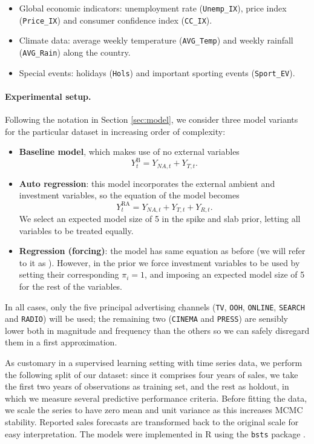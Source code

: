 \begin{itemize}
\item Global economic indicators: unemployment rate (\texttt{Unemp\_IX}), price index (\texttt{Price\_IX}) and consumer confidence index (\texttt{CC\_IX}).
\item Climate data: average weekly temperature (\texttt{AVG\_Temp}) and weekly rainfall (\texttt{AVG\_Rain}) along the country.
\item Special events: holidays (\texttt{Hols}) and important sporting events (\texttt{Sport\_EV}).
\end{itemize}

\paragraph{Experimental setup.}

Following the notation in Section \ref{sec:model}, we consider three model variants for the particular dataset in increasing order of complexity:


\begin{itemize}
\item \textbf{Baseline model}, which makes use of no external variables $$Y^{\text{B}}_t = Y_{NA,t} + Y_{T, t}.$$
\item \textbf{Auto regression}: this model  incorporates the external ambient and investment variables, so the equation of the model becomes 
$$ Y_t^{\text{RA}} = Y_{NA,t} + Y_{T, t} + Y_{R,t}.$$ We select an expected model size of 5 in the spike and slab prior, letting all variables to be treated equally.
\item \textbf{Regression (forcing)}: the model has same equation as before (we will refer to it as ).
However, in the prior we force investment variables to be used by setting their corresponding $\pi_i = 1$, and imposing an expected model size of 5 for the rest of the variables.
\end{itemize}
In all cases, only the five principal advertising channels (\texttt{TV}, \texttt{OOH}, \texttt{ONLINE}, \texttt{SEARCH} and \texttt{RADIO}) will be used; the remaining two (\texttt{CINEMA} and \texttt{PRESS}) are sensibly lower both in magnitude and frequency than the others so we can safely disregard them in a first approximation. 


As customary in a supervised learning setting with time series data, we perform the following split of our dataset: since it comprises four years of sales, we take the first two years of observations as training set, and the rest as holdout, in which we measure several predictive performance criteria. Before fitting the data, we scale the series to have zero mean and unit variance as this increases MCMC stability. Reported sales forecasts are transformed back to the original scale for easy interpretation. The models were implemented in R  using the \texttt{bsts} package \cite{scott2016bsts}.

